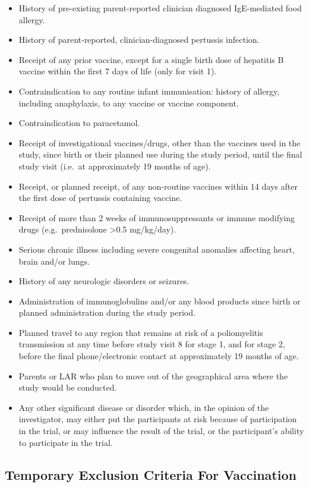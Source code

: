 \documentclass{bmcart}
\begin{document}
\begin{itemize}
	\item History of pre-existing parent-reported clinician diagnosed IgE-mediated food allergy.
	\item History of parent-reported, clinician-diagnosed pertussis infection.
	\item Receipt of any prior vaccine, except for a single birth dose of hepatitis B vaccine within the first 7 days of life (only for visit 1).
	\item Contraindication to any routine infant immunisation: history of allergy, including anaphylaxis, to any vaccine or vaccine component.
	\item Contraindication to paracetamol.
	\item Receipt of investigational vaccines/drugs, other than the vaccines used in the study, since birth or their planned use during the study period, until the final study visit (i.e.~at approximately 19 months of age).
	\item Receipt, or planned receipt, of any non-routine vaccines within 14 days after the first dose of pertussis containing vaccine.
	\item Receipt of more than 2 weeks of immunosuppressants or immune modifying drugs (e.g.~prednisolone \textgreater0.5 mg/kg/day).
	\item Serious chronic illness including severe congenital anomalies affecting heart, brain and/or lungs.
	\item History of any neurologic disorders or seizures.
	\item Administration of immunoglobulins and/or any blood products since birth or planned administration during the study period.
	\item Planned travel to any region that remains at risk of a poliomyelitis transmission at any time before study visit 8 for stage 1, and for stage 2, before the final phone/electronic contact at approximately 19 months of age.
	\item Parents or LAR who plan to move out of the geographical area where the study would be conducted.
	\item Any other significant disease or disorder which, in the opinion of the investigator, may either put the participants at risk because of participation in the trial, or may influence the result of the trial, or the participant's ability to participate in the trial.
\end{itemize}

\subsection*{Temporary Exclusion Criteria For Vaccination}
\end{document}

